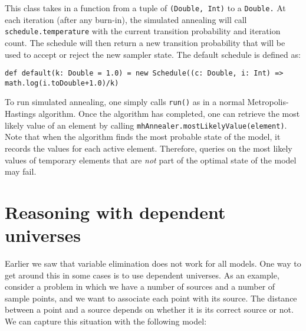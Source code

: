This class takes in a function from a tuple of  \texttt{(Double, Int)} to a \texttt{Double.} At each iteration (after any burn-in), the simulated annealing will call \texttt{schedule.temperature} with the current transition probability and iteration count. The schedule will then return a new transition probability that will be used to accept or reject the new sampler state. The default schedule is defined as:

\begin{flushleft}
\texttt{def default(k: Double = 1.0) = new Schedule((c: Double, i: Int) 
\newline \tab => math.log(i.toDouble+1.0)/k)}
\end{flushleft}

To run simulated annealing, one simply calls \texttt{run()} as in a normal Metropolis-Hastings algorithm. Once the algorithm has completed, one can retrieve the most likely value of an element by calling \texttt{mhAnneal\-er.mostLikelyValue(element)}. Note that when the algorithm finds the most probable state of the model, it records the values for each active element. Therefore, queries on the most likely values of temporary elements that are \emph{not} part of the optimal state of the model may fail.

\section{Reasoning with dependent universes}

Earlier we saw that variable elimination does not work for all models. One way to get around this in some cases is to use dependent universes. As an example, consider a problem in which we have a number of sources and a number of sample points, and we want to associate each point with its source. The distance between a point and a source depends on whether it is its correct source or not. We can capture this situation with the following model:

